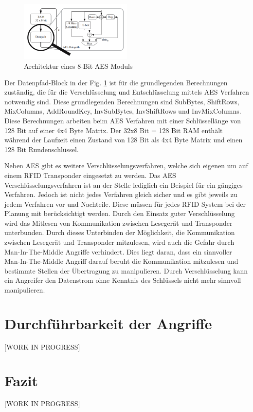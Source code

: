 \documentclass[conference]{IEEEtran}
\begin{document}
\begin{figure}[htbp]
\centerline{\includegraphics[width=0.5\textwidth]{img/AES.png}}
\caption{Architektur eines 8-Bit AES Moduls \cite{b9}}
\label{fig6}
\end{figure}

Der Datenpfad-Block in der Fig. \ref{fig6} ist für die grundlegenden Berechnungen zuständig, die für die Verschlüsselung und Entschlüsselung mittels AES Verfahren notwendig sind. Diese grundlegenden Berechnungen sind SubBytes, ShiftRows, MixColumns, AddRoundKey, InvSubBytes,  InvShiftRows und InvMixColumns. Diese Berechnungen arbeiten beim AES Verfahren mit einer Schlüssellänge von 128 Bit auf einer 4x4 Byte Matrix. Der 32x8 Bit = 128 Bit RAM enthält während der Laufzeit einen Zustand von 128 Bit als 4x4 Byte Matrix und einen 128 Bit Rundenschlüssel.

Neben AES gibt es weitere Verschlüsselungsverfahren, welche sich eigenen um auf einem RFID Transponder eingesetzt zu werden. Das AES Verschlüsselungsverfahren ist an der Stelle lediglich ein Beispiel für ein gängiges Verfahren. Jedoch ist nicht jedes Verfahren gleich sicher und es gibt jeweils zu jedem Verfahren vor und Nachteile. Diese müssen für jedes RFID System bei der Planung mit berücksichtigt werden. Durch den Einsatz guter Verschlüsselung wird das Mitlesen von Kommunikation zwischen Lesegerät und Transponder unterbunden. Durch dieses Unterbinden der Möglichkeit, die Kommunikation zwischen Lesegerät und Transponder mitzulesen, wird auch die Gefahr durch Man-In-The-Middle Angriffe verhindert. Dies liegt daran, dass ein sinnvoller Man-In-The-Middle Angriff darauf beruht die Kommunikation mitzulesen und bestimmte Stellen der Übertragung zu manipulieren. Durch Verschlüsselung kann ein Angreifer den Datenstrom ohne Kenntnis des Schlüssels nicht mehr sinnvoll manipulieren.

\section{Durchführbarkeit der Angriffe}
[WORK IN PROGRESS]

\section{Fazit}
[WORK IN PROGRESS]
\end{document}

